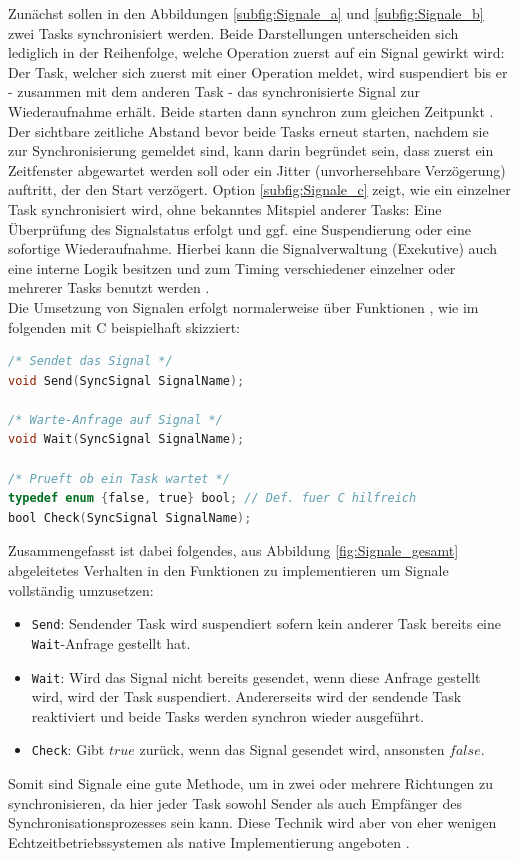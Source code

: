 \documentclass{llncs}
\begin{document}
Zunächst sollen in den Abbildungen \ref{subfig:Signale_a} und \ref{subfig:Signale_b} zwei Tasks synchronisiert werden. Beide Darstellungen unterscheiden sich lediglich in der Reihenfolge, welche Operation zuerst auf ein Signal gewirkt wird: Der Task, welcher sich zuerst mit einer Operation meldet, wird suspendiert bis er - zusammen mit dem anderen Task - das synchronisierte Signal zur Wiederaufnahme erhält. Beide starten dann synchron zum gleichen Zeitpunkt \autocite[vgl.][90-91]{Cooling2017}.
Der sichtbare zeitliche Abstand bevor beide Tasks erneut starten, nachdem sie zur Synchronisierung gemeldet sind, kann darin begründet sein, dass zuerst ein Zeitfenster abgewartet werden soll oder ein Jitter (unvorhersehbare Verzögerung) auftritt, der den Start verzögert.
Option \ref{subfig:Signale_c} zeigt, wie ein einzelner Task synchronisiert wird, ohne bekanntes Mitspiel anderer Tasks: Eine Überprüfung des Signalstatus erfolgt und ggf. eine Suspendierung oder eine sofortige Wiederaufnahme. Hierbei kann die Signalverwaltung (Exekutive) auch eine interne Logik besitzen und zum Timing verschiedener einzelner oder mehrerer Tasks benutzt werden \autocite[vgl.][91]{Cooling2017}.\\

Die Umsetzung von Signalen erfolgt normalerweise über Funktionen \autocite[vgl.][91]{Cooling2017}, wie im folgenden mit C beispielhaft skizziert:
\begin{lstlisting}[language=C]
/* Sendet das Signal */
void Send(SyncSignal SignalName);

/* Warte-Anfrage auf Signal */
void Wait(SyncSignal SignalName);

/* Prueft ob ein Task wartet */
typedef enum {false, true} bool; // Def. fuer C hilfreich
bool Check(SyncSignal SignalName);
\end{lstlisting}
Zusammengefasst ist dabei folgendes, aus Abbildung \ref{fig:Signale_gesamt} abgeleitetes Verhalten in den Funktionen zu implementieren um Signale vollständig umzusetzen:
\begin{itemize}
	\item \texttt{Send}: Sendender Task wird suspendiert sofern kein anderer Task bereits eine \texttt{Wait}-Anfrage gestellt hat.
	\item \texttt{Wait}: Wird das Signal nicht bereits gesendet, wenn diese Anfrage gestellt wird, wird der Task suspendiert. Andererseits wird der sendende Task reaktiviert und beide Tasks werden synchron wieder ausgeführt.
	\item \texttt{Check}: Gibt $true$ zurück, wenn das Signal gesendet wird, ansonsten $false$.
\end{itemize}
Somit sind Signale eine gute Methode, um in zwei oder mehrere Richtungen zu synchronisieren, da hier jeder Task sowohl Sender als auch Empfänger des Synchronisationsprozesses sein kann. Diese Technik wird aber von eher wenigen Echtzeitbetriebssystemen als native Implementierung angeboten \autocite[vgl.][91]{Cooling2017}.
\end{document}
